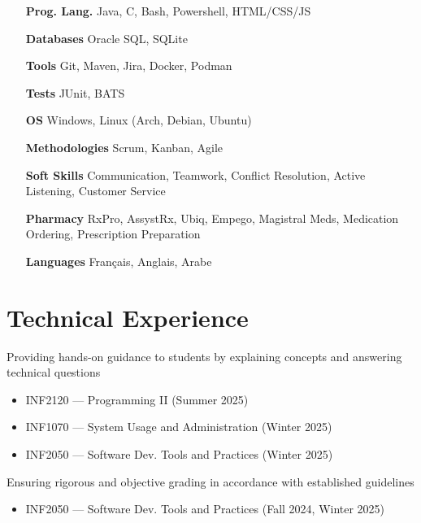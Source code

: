 \documentclass[letterpaper,10pt]{article}
\begin{document}
  \begin{multicols}{2}
    \begin{itemize}[itemsep=-2px, parsep=5pt, leftmargin=75pt]
      \item[\textbf{Prog. Lang.}] Java, C, Bash, Powershell, HTML/CSS/JS
      \item[\textbf{Databases}] Oracle SQL, SQLite
      \item[\textbf{Tools}] Git, Maven, Jira, Docker, Podman
      \item[\textbf{Tests}] JUnit, BATS
      \item[\textbf{OS}]  Windows, Linux (Arch, Debian, Ubuntu)
      \item[\textbf{Methodologies}]  Scrum, Kanban, Agile
      \item[\textbf{Soft Skills}]  Communication, Teamwork, Conflict Resolution, Active Listening, Customer Service
      \item[\textbf{Pharmacy}]  RxPro, AssystRx, Ubiq, Empego, Magistral Meds, Medication Ordering, Prescription Preparation
      \item[\textbf{Languages}]  Français, Anglais, Arabe
    \end{itemize}
  \end{multicols}


  \section{Technical Experience}

  \begin{resume_list}
    \item Providing hands-on guidance to students by explaining concepts and answering technical questions
    \begin{itemize}
        \item INF2120 — Programming II (Summer 2025)
        \item INF1070 — System Usage and Administration (Winter 2025)
        \item INF2050 — Software Dev. Tools and Practices (Winter 2025)
    \end{itemize}
  \vspace{3pt}
  
    \item Ensuring rigorous and objective grading in accordance with established guidelines
    \begin{itemize}
        \item INF2050 — Software Dev. Tools and Practices (Fall 2024, Winter 2025)
    \end{itemize}
  \end{resume_list}
\end{document}
